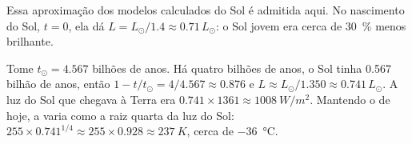 Essa aproximação dos modelos calculados do Sol é admitida aqui. No
nascimento do Sol, $t = 0$, ela dá $L = L_\odot/1.4 \approx 0.71\,L_\odot$:
o Sol jovem era cerca de \qty{30}{\percent} menos brilhante.

\begin{example}\label{ex:g12:early-earth:young-sun}
Tome $t_\odot = 4.567$ bilhões de anos. Há quatro bilhões de anos, o Sol
tinha 0.567 bilhão de anos, então $1 - t/t_\odot = 4/4.567 \approx 0.876$ e
$L \approx L_\odot/1.350 \approx 0.741\,L_\odot$. A luz do Sol que chegava à
Terra era $0.741 \times 1361 \approx \qty{1008}{W/m^2}$. Mantendo o 
de hoje, a  varia como a raiz quarta da
luz do Sol: $255 \times 0.741^{1/4} \approx 255 \times 0.928 \approx
\qty{237}{K}$, cerca de \qty{-36}{\celsius}.
\end{example}

